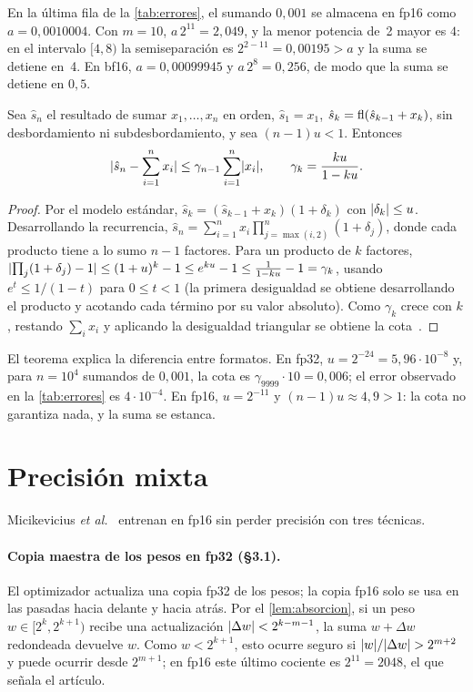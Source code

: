 \begin{ejemplo}[Estancamiento en fp16 y bf16]\label{ej:estancamiento}
En la última fila de la \cref{tab:errores}, el sumando $0{,}001$ se almacena en fp16 como $a=0{,}0010004$. Con $m=10$, $a\,2^{11}=2{,}049$, y la menor potencia de~2 mayor es $4$: en el intervalo $[4,8)$ la semiseparación es $2^{2-11}=0{,}00195>a$ y la suma se detiene en~4. En bf16, $a=0{,}00099945$ y $a\,2^{8}=0{,}256$, de modo que la suma se detiene en $0{,}5$.
\end{ejemplo}

\begin{teorema}\label{teo:suma}
Sea $\hat s_n$ el resultado de sumar $x_1,\dots,x_n$ en orden, $\hat s_1=x_1$, $\hat s_k=\operatorname{fl}(\hat s_{k-1}+x_k)$, sin desbordamiento ni subdesbordamiento, y sea $(n-1)u<1$. Entonces
\[
\lvert\hat s_n-\sum_{i=1}^{n}x_i\rvert\le\gamma_{n-1}\sum_{i=1}^{n}\lvert x_i\rvert,\qquad\gamma_k=\frac{ku}{1-ku}.
\]
\end{teorema}

\begin{proof}
Por el modelo estándar, $\hat s_k=(\hat s_{k-1}+x_k)(1+\delta_k)$ con $\lvert\delta_k\rvert\le u$. Desarrollando la recurrencia, $\hat s_n=\sum_{i=1}^{n}x_i\prod_{j=\max(i,2)}^{n}(1+\delta_j)$, donde cada producto tiene a lo sumo $n-1$ factores. Para un producto de $k$ factores, $\lvert\prod_j(1+\delta_j)-1\rvert\le(1+u)^{k}-1\le e^{ku}-1\le\frac{1}{1-ku}-1=\gamma_k$, usando $e^{t}\le 1/(1-t)$ para $0\le t<1$ (la primera desigualdad se obtiene desarrollando el producto y acotando cada término por su valor absoluto). Como $\gamma_k$ crece con $k$, restando $\sum_ix_i$ y aplicando la desigualdad triangular se obtiene la cota~\cite{higham}.
\end{proof}

El teorema explica la diferencia entre formatos. En fp32, $u=2^{-24}=5{,}96\cdot 10^{-8}$ y, para $n=10^{4}$ sumandos de $0{,}001$, la cota es $\gamma_{9999}\cdot 10=0{,}006$; el error observado en la \cref{tab:errores} es $4\cdot 10^{-4}$. En fp16, $u=2^{-11}$ y $(n-1)u\approx 4{,}9>1$: la cota no garantiza nada, y la suma se estanca.

\section{Precisión mixta}

Micikevicius \emph{et al.}~\cite[§3]{micikevicius} entrenan en fp16 sin perder precisión con tres técnicas.

\paragraph{Copia maestra de los pesos en fp32 (§3.1).} El optimizador actualiza una copia fp32 de los pesos; la copia fp16 solo se usa en las pasadas hacia delante y hacia atrás. Por el \cref{lem:absorcion}, si un peso $w\in[2^{k},2^{k+1})$ recibe una actualización $\lvert\Delta w\rvert<2^{k-m-1}$, la suma $w+\Delta w$ redondeada devuelve $w$. Como $w<2^{k+1}$, esto ocurre seguro si $\lvert w\rvert/\lvert\Delta w\rvert>2^{m+2}$ y puede ocurrir desde $2^{m+1}$; en fp16 este último cociente es $2^{11}=2048$, el que señala el artículo.

